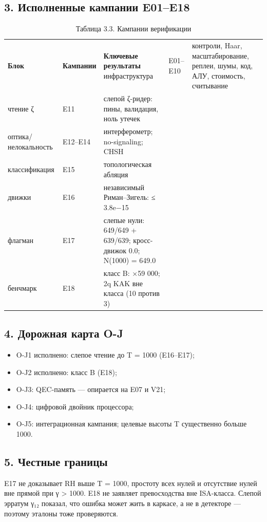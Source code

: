 \documentclass[11pt,a4paper]{article}
\begin{document}
\subsection{3. Исполненные кампании E01–E18}

\begin{table}[htbp]\centering\small
\caption{Таблица 3.3. Кампании верификации}
\begin{tabular}{p{} p{} p{}}
\toprule
\textbf{Блок} & \textbf{Кампании} & \textbf{Ключевые результаты}
\midrule
инфраструктура & E01–E10 & контроли, Haar, масштабирование, реплеи, шумы, код, АЛУ, стоимость, считывание \\
чтение ζ & E11 & слепой ζ-ридер: пины, валидация, ноль утечек \\
оптика/нелокальность & E12–E14 & интерферометр; no-signaling; CHSH \\
классификация & E15 & топологическая абляция \\
движки & E16 & независимый Риман–Зигель: ≤ 3.8e−15 \\
флагман & E17 & слепые нули: 649/649 + 639/639; кросс-движок 0.0; N(1000) = 649.0 \\
бенчмарк & E18 & класс B: ×59 000; 2q KAK вне класса (10 против 3) \\
\bottomrule
\end{tabular}
\end{table}

\subsection{4. Дорожная карта O-J}

\begin{itemize}
  \item O-J1 исполнено: слепое чтение до T = 1000 (E16–E17);
  \item O-J2 исполнено: класс B (E18);
  \item O-J3: QEC-память — опирается на E07 и V21;
  \item O-J4: цифровой двойник процессора;
  \item O-J5: интеграционная кампания; целевые высоты T существенно больше 1000.
\end{itemize}

\subsection{5. Честные границы}

E17 не доказывает RH выше T = 1000, простоту всех нулей и отсутствие нулей вне прямой при γ > 1000. E18 не заявляет превосходства вне ISA-класса. Слепой эрратум γ₁₂ показал, что ошибка может жить в каркасе, а не в детекторе — поэтому эталоны тоже проверяются.
\end{document}
